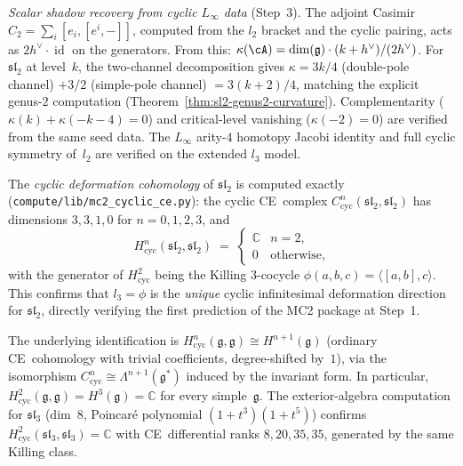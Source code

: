 \item \emph{Scalar shadow recovery from cyclic $L_\infty$ data}
  \textup{(}Step~3\textup{)}.
  The adjoint Casimir $C_2 = \sum_i [e_i,[e^i,-]]$, computed from the
  $l_2$ bracket and the cyclic pairing, acts as $2h^\vee\cdot\operatorname{id}$
  on the generators.  From this:
  $\kappa(\cA) = \dim(\mathfrak{g})\cdot(k+h^\vee)/(2h^\vee)$.
  For $\mathfrak{sl}_2$ at level~$k$, the two-channel decomposition
  gives $\kappa = 3k/4$ (double-pole channel) $+ 3/2$
  (simple-pole channel) $= 3(k+2)/4$,
  matching the explicit genus-$2$ computation
  (Theorem~\ref{thm:sl2-genus2-curvature}).
  Complementarity ($\kappa(k)+\kappa(-k-4)=0$) and critical-level vanishing
  ($\kappa(-2)=0$) are verified from the same seed data.
  The $L_\infty$ arity-$4$ homotopy Jacobi identity and full cyclic symmetry
  of~$l_2$ are verified on the extended $l_3$ model.

\item The \emph{cyclic deformation cohomology} of $\mathfrak{sl}_2$
  is computed exactly
  \textup{(}\nolinkurl{compute/lib/mc2_cyclic_ce.py}\textup{)}:
  the cyclic CE~complex
  $C^n_{\mathrm{cyc}}(\mathfrak{sl}_2, \mathfrak{sl}_2)$
  has dimensions $3, 3, 1, 0$ for $n = 0, 1, 2, 3$, and
  \[
  H^n_{\mathrm{cyc}}(\mathfrak{sl}_2, \mathfrak{sl}_2)
  \;=\;
  \begin{cases}
  \mathbb{C} & n = 2,\\
  0 & \text{otherwise},
  \end{cases}
  \]
  with the generator of $H^2_{\mathrm{cyc}}$ being the
  Killing $3$-cocycle
  $\phi(a,b,c) = \langle [a,b], c \rangle$.
  This confirms that $l_3 = \phi$ is the \emph{unique}
  cyclic infinitesimal deformation direction for
  $\mathfrak{sl}_2$, directly verifying the first prediction
  of the MC2 package at Step~1.

  The underlying identification is
  $H^n_{\mathrm{cyc}}(\mathfrak{g},\mathfrak{g})\cong
  H^{n+1}(\mathfrak{g})$ (ordinary CE~cohomology with trivial
  coefficients, degree-shifted by~$1$), via the isomorphism
  $C^n_{\mathrm{cyc}}\cong \Lambda^{n+1}(\mathfrak{g}^*)$
  induced by the invariant form.
  In particular, $H^2_{\mathrm{cyc}}(\mathfrak{g},\mathfrak{g})
  =H^3(\mathfrak{g})=\mathbb{C}$ for every simple~$\mathfrak{g}$.
  The exterior-algebra computation for $\mathfrak{sl}_3$
  (dim~$8$, Poincar\'{e} polynomial $(1+t^3)(1+t^5)$)
  confirms $H^2_{\mathrm{cyc}}(\mathfrak{sl}_3,\mathfrak{sl}_3)=\mathbb{C}$
  with CE~differential ranks $8, 20, 35, 35$,
  generated by the same Killing class.

